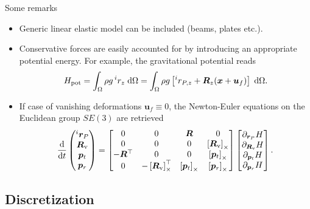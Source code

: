 \documentclass[aspectratio=169]{ISAE-Beamer}
\newcommand{\crmat}[1]{\ensuremath{\left[#1\right]_\times}}
\begin{document}
\begin{frame}{Some remarks}

\begin{itemize}
	\item Generic linear elastic model can be included (beams, plates etc.).
	\item Conservative forces are easily accounted for by introducing an appropriate potential energy. For example, the gravitational potential reads
	\begin{equation*}
	H_{\text{pot}} = \int_{\Omega} \rho g \, ^i r_z \d{\Omega} = \int_{\Omega} \rho g \left[ ^i r_{P, z} +\bm{R}_z (\bm{x} + \bm{u}_f) \right] \d{\Omega}.
	\end{equation*}
	\item If case of vanishing deformations $\bm{u}_f \equiv 0$, the Newton-Euler equations on the Euclidean group $SE(3)$ are retrieved
	\begin{equation*}
	\diff{}{t}
	\begin{pmatrix}
	^i{\bm{r}}_P \\
	\bm{R}_{\mathrm{v}} \\
	{\bm{p}}_t \\ 
	{\bm{p}}_r \\
	\end{pmatrix} = 
	\begin{bmatrix}
	0 & 0 & \bm{R} & 0 \\
	0 & 0 & 0 & \crmat{\bm{R}_{\text{v}}} \\
	- \bm{R}^\top & 0 & 0 & \crmat{\bm{p}_t}\\
	0 & -\crmat{\bm{R}_{\text{v}}}^\top & \crmat{\bm{p}_t} & \crmat{\bm{p}_r} \\
	\end{bmatrix}
	\begin{bmatrix}
	\partial_{\bm{r}_P} H \\ 
	\partial_{\bm{R}_{\text{v}}} H \\ 
	\partial_{\bm{p}_t} H \\ 
	\partial_{\bm{p}_r} H \\ 
	\end{bmatrix}.
	\end{equation*}
\end{itemize}
\end{frame}

\subsection{Discretization}
\end{document}
